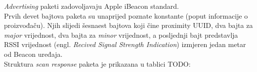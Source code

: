 \textit{Advertising} paketi zadovoljavaju Apple iBeacon\textsuperscript{\texttrademark} standard.
\\
Prvih devet bajtova paketa su unaprijed poznate konstante (poput informacije o proizvođaču). Njih slijedi šesnaest bajtova koji čine proximity UUID, dva bajta za \textit{major} vrijednost, dva bajta za \textit{minor} vrijednost, a posljednji bajt predstavlja RSSI vrijednost (engl. \textit{Recived Signal Strength Indication}) izmjeren jedan metar od Beacon uređaja.
\\

Struktura \textit{scan response} paketa je prikazana u tablici TODO:

